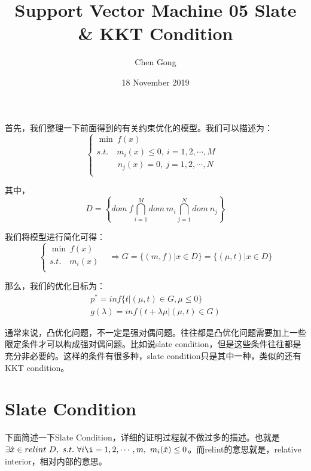 \documentclass[a4paper]{article}
\title{Support Vector Machine 05 Slate \& KKT Condition}
\author{Chen Gong}
\date{18 November 2019}
\begin{document}
\maketitle
首先，我们整理一下前面得到的有关约束优化的模型。我们可以描述为：
\begin{equation}
    \left\{
        \begin{array}{ll}
        \min\ f(x) & \\
        s.t. \quad m_i(x)\leq 0, \ i = 1, 2, \cdots, M & \\
        \ \; \qquad n_j(x)= 0, \ j = 1, 2, \cdots, N & \\
        \end{array}
    \right.
\end{equation}

其中，
\begin{equation}
    D = \left\{ dom\ f \bigcap_{i=1}^M dom\ m_i \bigcap_{j=1}^N dom\ n_j \right\}
\end{equation}

我们将模型进行简化可得：
\begin{equation}
    \left\{
        \begin{array}{ll}
        \min\ f(x) & \\
        s.t. \quad m_i(x) & \\
        \end{array}
    \right.
    \Longrightarrow
    G = \{ (m,f)|x\in D \} = \{ (\mu,t)|x\in D \}
\end{equation}

那么，我们的优化目标为：
\begin{gather}
    p^\ast = inf\{ t|(\mu,t)\in G,\mu \leq 0 \} \\ 
    g(\lambda) = inf(t+\lambda\mu|(\mu,t)\in G)
\end{gather}

通常来说，凸优化问题，不一定是强对偶问题。往往都是凸优化问题需要加上一些限定条件才可以构成强对偶问题。比如说slate condition，但是这些条件往往都是充分非必要的。这样的条件有很多种，slate condition只是其中一种，类似的还有KKT condition。

\section{Slate Condition}
下面简述一下Slate Condition，详细的证明过程就不做过多的描述。也就是$\exists \hat{x} \in relint\ D, \ s.t. \ \forall i \i = 1,2,\cdots,m,\ m_i(\hat{x}) \leq 0$。而relint的意思就是，relative interior，相对内部的意思。
\end{document}
